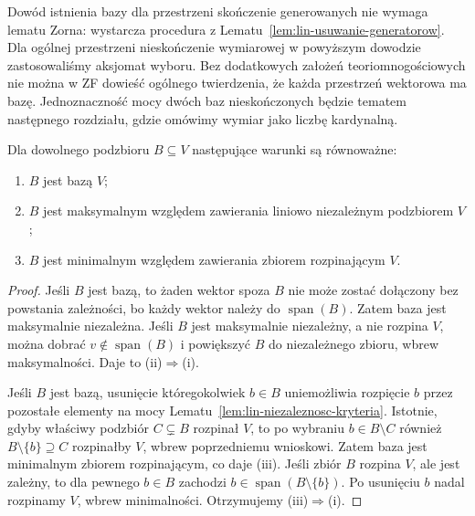 \begin{uwaga}
\label{rem:lin-aksjomat-wyboru}
Dowód istnienia bazy dla przestrzeni skończenie
generowanych nie wymaga lematu Zorna:
wystarcza procedura z
Lematu~\ref{lem:lin-usuwanie-generatorow}.
Dla ogólnej przestrzeni nieskończenie wymiarowej
w powyższym dowodzie zastosowaliśmy aksjomat wyboru.
Bez dodatkowych założeń teoriomnogościowych nie
można w ZF dowieść ogólnego twierdzenia,
że każda przestrzeń wektorowa ma bazę.
Jednoznaczność mocy dwóch baz nieskończonych
będzie tematem następnego rozdziału,
gdzie omówimy wymiar jako liczbę kardynalną.
\end{uwaga}

\begin{twierdzenie}
\label{thm:lin-charakterystyki-bazy}
Dla dowolnego podzbioru \(B\subseteq V\)
następujące warunki są równoważne:
\begin{enumerate}[label=(\roman*)]
\item \(B\) jest bazą \(V\);
\item \(B\) jest maksymalnym względem zawierania
      liniowo niezależnym podzbiorem \(V\);
\item \(B\) jest minimalnym względem zawierania
      zbiorem rozpinającym \(V\).
\end{enumerate}
\end{twierdzenie}
\begin{proof}
Jeśli \(B\) jest bazą, to żaden wektor spoza \(B\)
nie może zostać dołączony bez powstania zależności,
bo każdy wektor należy do \(\operatorname{span}(B)\).
Zatem baza jest maksymalnie niezależna.
Jeśli \(B\) jest maksymalnie niezależny, a nie rozpina \(V\),
można dobrać \(v\notin\operatorname{span}(B)\)
i powiększyć \(B\) do niezależnego zbioru,
wbrew maksymalności. Daje to (ii)\(\Rightarrow\)(i).

Jeśli \(B\) jest bazą, usunięcie któregokolwiek
\(b\in B\) uniemożliwia rozpięcie \(b\)
przez pozostałe elementy na mocy
Lematu~\ref{lem:lin-niezaleznosc-kryteria}.
Istotnie, gdyby właściwy podzbiór \(C\subsetneq B\)
rozpinał \(V\), to po wybraniu
\(b\in B\setminus C\) również
\(B\setminus\{b\}\supseteq C\) rozpinałby \(V\),
wbrew poprzedniemu wnioskowi.
Zatem baza jest minimalnym zbiorem rozpinającym,
co daje (iii).
Jeśli zbiór \(B\) rozpina \(V\), ale jest zależny,
to dla pewnego \(b\in B\) zachodzi
\(b\in\operatorname{span}(B\setminus\{b\})\).
Po usunięciu \(b\) nadal rozpinamy \(V\),
wbrew minimalności. Otrzymujemy (iii)\(\Rightarrow\)(i).
\end{proof}

